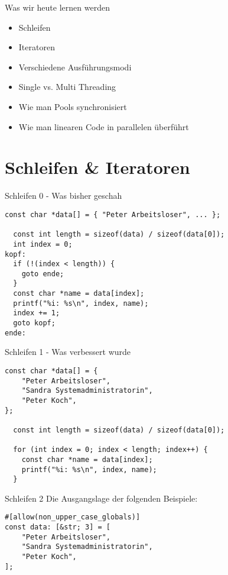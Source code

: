 \documentclass[aspectratio=1610,t]{beamer}
\begin{document}
\begin{frame}[fragile]{Was wir heute lernen werden}

\begin{itemize}
 \item Schleifen
 \item Iteratoren
 \item Verschiedene Ausführungsmodi
 \item Single vs. Multi Threading
 \item Wie man Pools synchronisiert
 \item Wie man linearen Code in parallelen überführt
\end{itemize}

\end{frame}

{
\section{Schleifen \& Iteratoren}
}

\begin{frame}[fragile]{Schleifen 0 - Was bisher geschah}
\begin{verbatim}
const char *data[] = { "Peter Arbeitsloser", ... };

  const int length = sizeof(data) / sizeof(data[0]);
  int index = 0;
kopf:
  if (!(index < length)) {
    goto ende;
  }
  const char *name = data[index];
  printf("%i: %s\n", index, name);
  index += 1;
  goto kopf;
ende:
\end{verbatim}
\end{frame}

\begin{frame}[fragile]{Schleifen 1 - Was verbessert wurde}
\begin{verbatim}
const char *data[] = {
    "Peter Arbeitsloser",
    "Sandra Systemadministratorin",
    "Peter Koch",
};

  const int length = sizeof(data) / sizeof(data[0]);

  for (int index = 0; index < length; index++) {
    const char *name = data[index];
    printf("%i: %s\n", index, name);
  }
\end{verbatim}
\end{frame}

\begin{frame}[fragile]{Schleifen 2}
Die Ausgangslage der folgenden Beispiele:

\begin{verbatim}
#[allow(non_upper_case_globals)]
const data: [&str; 3] = [
    "Peter Arbeitsloser",
    "Sandra Systemadministratorin",
    "Peter Koch",
];
\end{verbatim}
\end{frame}
\end{document}
